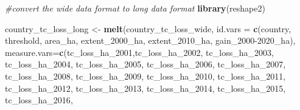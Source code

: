 \documentclass[
]{article}
\newenvironment{Shaded}{\begin{snugshade}}{\end{snugshade}}
\newcommand{\AttributeTok}[1]{\textcolor[rgb]{0.13,0.29,0.53}{#1}}
\newcommand{\CommentTok}[1]{\textcolor[rgb]{0.56,0.35,0.01}{\textit{#1}}}
\newcommand{\FunctionTok}[1]{\textcolor[rgb]{0.13,0.29,0.53}{\textbf{#1}}}
\newcommand{\NormalTok}[1]{#1}
\newcommand{\OtherTok}[1]{\textcolor[rgb]{0.56,0.35,0.01}{#1}}
\newcommand{\StringTok}[1]{\textcolor[rgb]{0.31,0.60,0.02}{#1}}
\begin{document}
\begin{Shaded}
\begin{Highlighting}[]
\CommentTok{\#convert the wide data format to long data format}
\FunctionTok{library}\NormalTok{(reshape2)}

\NormalTok{country\_tc\_loss\_long }\OtherTok{\textless{}{-}} \FunctionTok{melt}\NormalTok{(country\_tc\_loss\_wide, }
                             \AttributeTok{id.vars =} \FunctionTok{c}\NormalTok{(}\StringTok{\textquotesingle{}country\textquotesingle{}}\NormalTok{, }\StringTok{\textquotesingle{}threshold\textquotesingle{}}\NormalTok{, }\StringTok{\textquotesingle{}area\_ha\textquotesingle{}}\NormalTok{, }
                                         \StringTok{\textquotesingle{}extent\_2000\_ha\textquotesingle{}}\NormalTok{, }\StringTok{\textquotesingle{}extent\_2010\_ha\textquotesingle{}}\NormalTok{, }
                                         \StringTok{\textquotesingle{}gain\_2000{-}2020\_ha\textquotesingle{}}\NormalTok{), }
                             \AttributeTok{measure.vars=}\FunctionTok{c}\NormalTok{(}\StringTok{\textquotesingle{}tc\_loss\_ha\_2001\textquotesingle{}}\NormalTok{,}\StringTok{\textquotesingle{}tc\_loss\_ha\_2002\textquotesingle{}}\NormalTok{, }
                                            \StringTok{\textquotesingle{}tc\_loss\_ha\_2003\textquotesingle{}}\NormalTok{, }\StringTok{\textquotesingle{}tc\_loss\_ha\_2004\textquotesingle{}}\NormalTok{, }
                                            \StringTok{\textquotesingle{}tc\_loss\_ha\_2005\textquotesingle{}}\NormalTok{, }\StringTok{\textquotesingle{}tc\_loss\_ha\_2006\textquotesingle{}}\NormalTok{,}
                                            \StringTok{\textquotesingle{}tc\_loss\_ha\_2007\textquotesingle{}}\NormalTok{, }\StringTok{\textquotesingle{}tc\_loss\_ha\_2008\textquotesingle{}}\NormalTok{, }
                                            \StringTok{\textquotesingle{}tc\_loss\_ha\_2009\textquotesingle{}}\NormalTok{, }\StringTok{\textquotesingle{}tc\_loss\_ha\_2010\textquotesingle{}}\NormalTok{, }
                                            \StringTok{\textquotesingle{}tc\_loss\_ha\_2011\textquotesingle{}}\NormalTok{, }\StringTok{\textquotesingle{}tc\_loss\_ha\_2012\textquotesingle{}}\NormalTok{,}
                                            \StringTok{\textquotesingle{}tc\_loss\_ha\_2013\textquotesingle{}}\NormalTok{, }\StringTok{\textquotesingle{}tc\_loss\_ha\_2014\textquotesingle{}}\NormalTok{, }
                                            \StringTok{\textquotesingle{}tc\_loss\_ha\_2015\textquotesingle{}}\NormalTok{, }\StringTok{\textquotesingle{}tc\_loss\_ha\_2016\textquotesingle{}}\NormalTok{, }

\end{Highlighting}
\end{Shaded}
\end{document}
